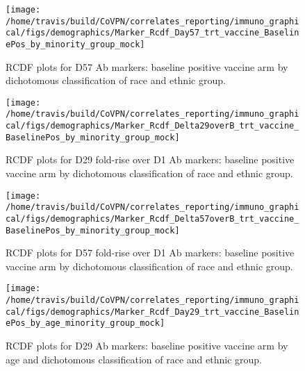 \documentclass[]{book}
\theoremstyle{definition}
\theoremstyle{definition}
\theoremstyle{definition}
\newcommand{\1}{\mathbbm{1}}
\begin{document}
\clearpage
\begin{figure}[H]

{\centering \texttt{[image: /home/travis/build/CoVPN/correlates\_reporting/immuno\_graphical/figs/demographics/Marker\_Rcdf\_Day57\_trt\_vaccine\_BaselinePos\_by\_minority\_group\_mock]} 

}

\caption{RCDF plots for D57 Ab markers: baseline positive vaccine arm by dichotomous classification of race and ethnic group.}\label{fig:unnamed-chunk-121}
\end{figure}

\clearpage
\begin{figure}[H]

{\centering \texttt{[image: /home/travis/build/CoVPN/correlates\_reporting/immuno\_graphical/figs/demographics/Marker\_Rcdf\_Delta29overB\_trt\_vaccine\_BaselinePos\_by\_minority\_group\_mock]} 

}

\caption{RCDF plots for D29 fold-rise over D1 Ab markers: baseline positive vaccine arm by dichotomous classification of race and ethnic group.}\label{fig:unnamed-chunk-122}
\end{figure}

\clearpage
\begin{figure}[H]

{\centering \texttt{[image: /home/travis/build/CoVPN/correlates\_reporting/immuno\_graphical/figs/demographics/Marker\_Rcdf\_Delta57overB\_trt\_vaccine\_BaselinePos\_by\_minority\_group\_mock]} 

}

\caption{RCDF plots for D57 fold-rise over D1 Ab markers: baseline positive vaccine arm by dichotomous classification of race and ethnic group.}\label{fig:unnamed-chunk-123}
\end{figure}

\clearpage
\begin{figure}[H]

{\centering \texttt{[image: /home/travis/build/CoVPN/correlates\_reporting/immuno\_graphical/figs/demographics/Marker\_Rcdf\_Day29\_trt\_vaccine\_BaselinePos\_by\_age\_minority\_group\_mock]} 

}

\caption{RCDF plots for D29 Ab markers: baseline positive vaccine arm by age and dichotomous classification of race and ethnic group.}\label{fig:unnamed-chunk-124}
\end{figure}
\end{document}
